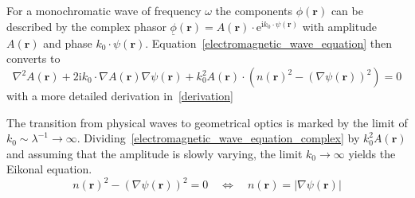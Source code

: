 For a monochromatic wave of frequency \(\omega \) the components \(\phi(\bm{r})\) can be described by the complex phasor \(\underline{\phi}(\bm{r}) = A(\bm{r}) \cdot \mathrm{e}^{\mathrm{i} k_0 \cdot \psi(\bm{r})}\) with amplitude \(A(\bm{r})\) and phase \(k_0 \cdot \psi(\bm{r})\).
Equation~\eqref{electromagnetic_wave_equation} then converts to 
\begin{equation}\label{electromagnetic_wave_equation_complex}
    \nabla^2 A(\bm{r}) + 2\mathrm{i}k_0 \cdot \nabla A(\bm{r}) \nabla \psi(\bm{r}) + k_0^2 A(\bm{r}) \cdot ({n(\bm{r})}^2 - {(\nabla \psi(\bm{r}))}^2) = 0
\end{equation}
with a more detailed derivation in~\ref{derivation}

The transition from physical waves to geometrical optics is marked by the limit of \(k_0 \sim  \lambda^{-1} \rightarrow \infty \).
Dividing~\eqref{electromagnetic_wave_equation_complex} by \(k_0^2 A(\bm{r})\) and assuming that the amplitude is slowly varying, the limit \(k_0 \rightarrow \infty \) yields the Eikonal equation.
\begin{equation}
    {n(\bm{r})}^2 - {(\nabla \psi(\bm{r}))}^2 = 0 \quad \Leftrightarrow \quad n(\bm{r}) = |\nabla \psi(\bm{r})|
\end{equation}


